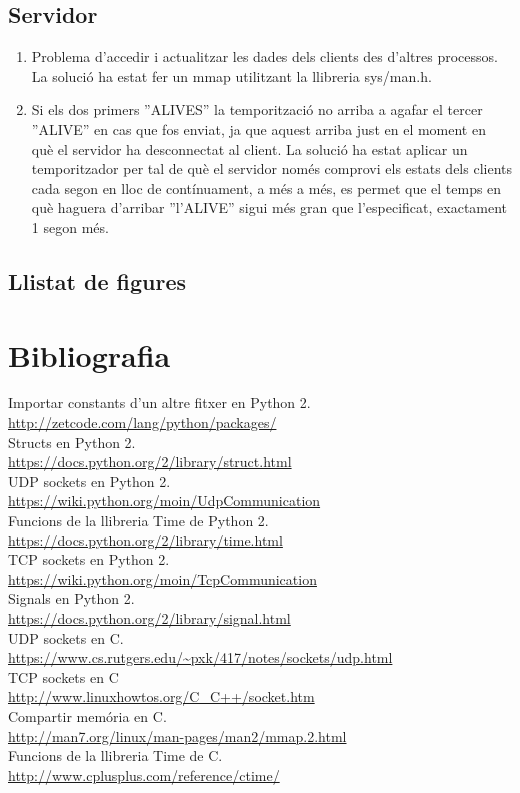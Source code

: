 \documentclass[11pt]{article}
\begin{document}
\subsection*{Servidor}
\begin{enumerate}
\item Problema d'accedir i actualitzar les dades dels clients des d'altres processos. La solució ha estat fer un mmap utilitzant la llibreria sys/man.h.
\item Si els dos primers ''ALIVES'' la temporització no arriba a agafar el tercer ''ALIVE'' en cas que fos enviat, ja que aquest arriba just en el moment en què el servidor ha desconnectat al client. La solució ha estat aplicar un temporitzador per tal de què el servidor només comprovi els estats dels clients cada segon en lloc de contínuament, a més a més, es permet que el temps en què haguera d'arribar ''l'ALIVE'' sigui més gran que l'especificat, exactament 1 segon més.
\end{enumerate}
	\subsection{Llistat de figures}
\listoffigures{}
\newpage
\section{Bibliografia}
Importar constants d'un altre fitxer en Python 2.\\
\url{http://zetcode.com/lang/python/packages/}\\
Structs en Python 2.\\
\url{https://docs.python.org/2/library/struct.html}\\
UDP sockets en Python 2.\\
\url{https://wiki.python.org/moin/UdpCommunication}\\
Funcions de la llibreria Time de Python 2.\\	
\url{https://docs.python.org/2/library/time.html}\\
TCP sockets en Python 2.\\
\url{https://wiki.python.org/moin/TcpCommunication}\\
Signals en Python 2.\\	
\url{https://docs.python.org/2/library/signal.html}\\
UDP sockets en C.\\
\url{https://www.cs.rutgers.edu/~pxk/417/notes/sockets/udp.html}\\
TCP sockets en C\\
\url{http://www.linuxhowtos.org/C_C++/socket.htm}	\\
Compartir memória en C.\\
\url{http://man7.org/linux/man-pages/man2/mmap.2.html}\\
Funcions de la llibreria Time de C.\\
\url{http://www.cplusplus.com/reference/ctime/}\\
\end{document}
